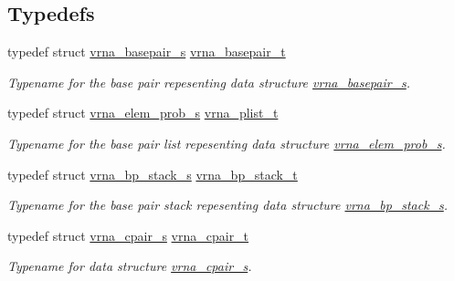 \subsection*{Typedefs}
\begin{DoxyCompactItemize}
\item 
typedef struct \mbox{\hyperlink{group__data__structures_structvrna__basepair__s}{vrna\+\_\+basepair\+\_\+s}} \mbox{\hyperlink{group__data__structures_gac8c5669d3fb813cacf506489689305ce}{vrna\+\_\+basepair\+\_\+t}}
\begin{DoxyCompactList}\small\item\em Typename for the base pair repesenting data structure \mbox{\hyperlink{group__data__structures_structvrna__basepair__s}{vrna\+\_\+basepair\+\_\+s}}. \end{DoxyCompactList}\item 
typedef struct \mbox{\hyperlink{group__struct__utils_structvrna__elem__prob__s}{vrna\+\_\+elem\+\_\+prob\+\_\+s}} \mbox{\hyperlink{group__data__structures_ga5bd6f0d16685b1249b7c3b73049dd5dc}{vrna\+\_\+plist\+\_\+t}}
\begin{DoxyCompactList}\small\item\em Typename for the base pair list repesenting data structure \mbox{\hyperlink{group__struct__utils_structvrna__elem__prob__s}{vrna\+\_\+elem\+\_\+prob\+\_\+s}}. \end{DoxyCompactList}\item 
typedef struct \mbox{\hyperlink{group__data__structures_structvrna__bp__stack__s}{vrna\+\_\+bp\+\_\+stack\+\_\+s}} \mbox{\hyperlink{group__data__structures_gaa651bda42e7692f08cb603cd6834b0ee}{vrna\+\_\+bp\+\_\+stack\+\_\+t}}
\begin{DoxyCompactList}\small\item\em Typename for the base pair stack repesenting data structure \mbox{\hyperlink{group__data__structures_structvrna__bp__stack__s}{vrna\+\_\+bp\+\_\+stack\+\_\+s}}. \end{DoxyCompactList}\item 
typedef struct \mbox{\hyperlink{group__data__structures_structvrna__cpair__s}{vrna\+\_\+cpair\+\_\+s}} \mbox{\hyperlink{group__data__structures_gae4fc91141cc69c6d8eaf1332cb991ecc}{vrna\+\_\+cpair\+\_\+t}}
\begin{DoxyCompactList}\small\item\em Typename for data structure \mbox{\hyperlink{group__data__structures_structvrna__cpair__s}{vrna\+\_\+cpair\+\_\+s}}. \end{DoxyCompactList}\item 

\end{DoxyCompactItemize}
